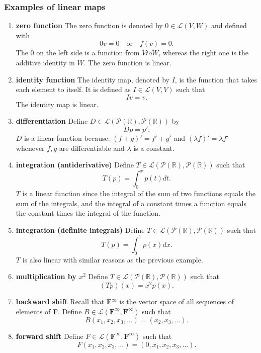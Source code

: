 \documentclass[11pt]{article}
\begin{document}
    \subsubsection{Examples of linear maps}

    \begin{enumerate}
        \item \textbf{zero function} The zero function is denoted by \(0 \in \mathcal{L}(V,W)\) and defined with \[0v = 0 \quad \text{or} \quad f(v) = 0.\] The 0 on the left side is a function from \(V to W\), whereas the right one is the additive identity in $W$. The zero function is linear.
        \item \textbf{identity function} The identity map, denoted by $I$, is the function that takes each element to itself. It is defined as \(I \in \mathcal{L}(V,V)\) such that \[Iv = v.\] The identity map is linear.
        \item \textbf{differentiation} Define \(D \in \mathcal{L}(\mathcal{P}(\mathbb{R}), \mathcal{P}(\mathbb{R}))\) by \[Dp = p'.\] $D$ is a linear function because: \((f + g)' = f' + g'\) and \((\lambda f)' = \lambda f'\) whenever $f,g$ are differentiable and $\lambda$ is a constant.
        \item \textbf{integration (antiderivative)} Define \(T \in \mathcal{L}(\mathcal{P}(\mathbb{R}), \mathcal{P}(\mathbb{R}))\) such that \[T(p) = \int_{0}^{x} p(t) dt.\] $T$ is a linear function since the integral of the sum of two functions equals the sum of the integrals, and the integral of a constant times a function equals the constant times the integral of the function. 
        \item \textbf{integration (definite integrals)} Define \(T \in \mathcal{L}(\mathcal{P}(\mathbb{R}), \mathcal{P}(\mathbb{R}))\) such that \[T(p) = \int_{0}^{1} p(x) dx.\] $T$ is also linear with similar reasons as the previous example. 
        \item \textbf{multiplication by \(x^2\)} Define \(T \in \mathcal{L}(\mathcal{P}(\mathbb{R}), \mathcal{P}(\mathbb{R}))\) such that \[(Tp)(x) = x^2 p(x).\]
        \item \textbf{backward shift} Recall that \textbf{F}\(^{\infty}\) is the vector space of all sequences of elements of \textbf{F}. Define \(B \in \mathcal{L}(\textbf{F}^{\infty}, \textbf{F}^{\infty})\) such that \[B(x_1,x_2,x_3, \dots) = (x_2, x_3, \dots).\]
        \item \textbf{forward shift} Define \(F \in \mathcal{L}(\textbf{F}^{\infty}, \textbf{F}^{\infty})\) such that \[F(x_1, x_2, x_3, \dots) = (0, x_1, x_2, x_3, \dots).\]

\end{enumerate}
\end{document}
